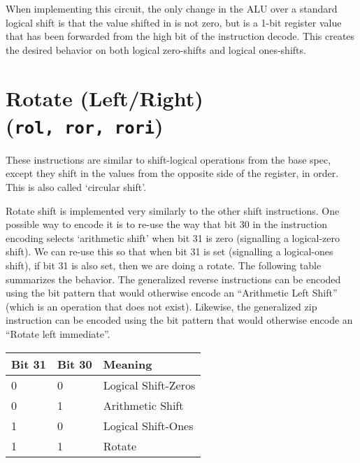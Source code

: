 When implementing this circuit, the only change in the ALU over a
standard logical shift is that the value shifted in is not zero, but is
a 1-bit register value that has been forwarded from the high bit of the
instruction decode. This creates the desired behavior on both logical
zero-shifts and logical ones-shifts.


\section{Rotate (Left/Right) (\texttt{rol,\ ror,\ rori})}

These instructions are similar to shift-logical operations from the base
spec, except they shift in the values from the opposite side of the
register, in order. This is also called `circular shift'.





Rotate shift is implemented very similarly to the other shift
instructions. One possible way to encode it is to re-use the way that
bit 30 in the instruction encoding selects `arithmetic shift' when bit
31 is zero (signalling a logical-zero shift). We can re-use this so that
when bit 31 is set (signalling a logical-ones shift), if bit 31 is also
set, then we are doing a rotate. The following table summarizes the
behavior. The generalized reverse instructions can be encoded using the
bit pattern that would otherwise encode an ``Arithmetic Left Shift''
(which is an operation that does not exist). Likewise, the generalized zip
instruction can be encoded using the bit pattern that would otherwise
encode an ``Rotate left immediate''.

\begin{center}
\begin{tabular}{lll}
Bit 31 & Bit 30 & Meaning \\
\hline
0 & 0 & Logical Shift-Zeros \\
0 & 1 & Arithmetic Shift \\
1 & 0 & Logical Shift-Ones \\
1 & 1 & Rotate \\
\end{tabular}
\end{center}


